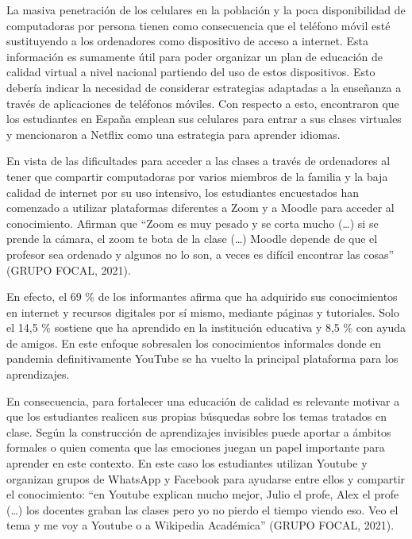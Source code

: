 \documentclass{textolivre}
\begin{document}
La masiva penetración de los celulares en la población y la poca disponibilidad de computadoras por persona tienen como consecuencia que el teléfono móvil esté sustituyendo a los ordenadores como dispositivo de acceso a internet. Esta información es sumamente útil para poder organizar un plan de educación de calidad virtual a nivel nacional partiendo del uso de estos dispositivos. Esto debería indicar la necesidad de considerar estrategias adaptadas a la enseñanza a través de aplicaciones de teléfonos móviles. Con respecto a esto, \textcite{martinez_uso_2020} encontraron que los estudiantes en España emplean sus celulares para entrar a sus clases virtuales y mencionaron a Netflix como una estrategia para aprender idiomas.

En vista de las dificultades para acceder a las clases a través de ordenadores al tener que compartir computadoras por varios miembros de la familia y la baja calidad de internet por su uso intensivo, los estudiantes encuestados han comenzado a utilizar plataformas diferentes a Zoom y a Moodle para acceder al conocimiento. Afirman que “Zoom es muy pesado y se corta mucho (…) si se prende la cámara, el zoom te bota de la clase (…) Moodle depende de que el profesor sea ordenado y algunos no lo son, a veces es difícil encontrar las cosas” (GRUPO FOCAL, 2021). 

En efecto, el 69 \% de los informantes afirma que ha adquirido sus conocimientos en internet y recursos digitales por sí mismo, mediante páginas y tutoriales. Solo el 14,5 \% sostiene que ha aprendido en la institución educativa y 8,5 \% con ayuda de amigos. En este enfoque sobresalen los conocimientos informales donde en pandemia definitivamente YouTube se ha vuelto la principal plataforma para los aprendizajes. 

En consecuencia, para fortalecer una educación de calidad es relevante motivar a que los estudiantes realicen sus propias búsquedas sobre los temas tratados en clase. Según \textcite{cobo_aprendizaje_2011} la construcción de aprendizajes invisibles puede aportar a ámbitos formales o \textcite{mendoza_castillo_lo_2020} quien comenta que las emociones juegan un papel importante para aprender en este contexto. En este caso los estudiantes utilizan Youtube y organizan grupos de WhatsApp y Facebook para ayudarse entre ellos y compartir el conocimiento: “en Youtube explican mucho mejor, Julio el profe, Alex el profe (…) los docentes graban las clases pero yo no pierdo el tiempo viendo eso. Veo el tema y me voy a Youtube o a Wikipedia Académica” (GRUPO FOCAL, 2021).
\end{document}

